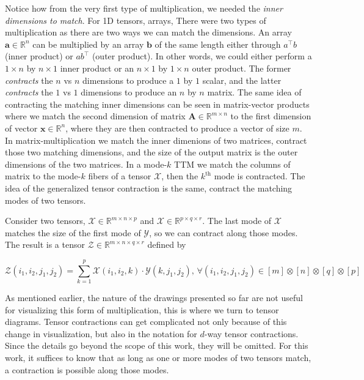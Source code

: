         Notice how from the very first type of multiplication, we needed the
        \textit{inner dimensions to match}. For 1D tensors, arrays, There were
        two types of multiplication as there are two ways we can match the
        dimensions. An array $\mathbf{a} \in \mathbb{R}^{n}$ can be multiplied
        by an array $\mathbf{b}$ of the same length either through $a^\intercal
        b$ (inner product) or $ab^\intercal$ (outer product). In other words, we
        could either perform a $1 \times n$ by $n\times 1$ inner product or an
        $n\times 1$ by $1\times n$ outer product. The former \textit{contracts}
        the $n$ vs $n$ dimensions to produce a $1$ by $1$ scalar, and the latter
        \textit{contracts} the $1$ vs $1$ dimensions to produce an $n$ by $n$
        matrix. The same idea of contracting the matching inner dimensions can
        be seen in matrix-vector products where we match the second dimension of
        matrix $\mathbf{A}\in \mathbb{R}^{m\times n}$ to the first dimension of
        vector $\mathbf{x}\in \mathbb{R}^n$, where they are then contracted to
        produce a vector of size $m$. In matrix-multiplication we match the
        inner dimenions of two matrices, contract those two matching dimensions,
        and the size of the output matrix is the outer dimensions of the two
        matrices. In a mode-$k$ TTM we match the columns of matrix to the
        mode-$k$ fibers of a tensor $\mathcal{X}$, then the $k^\text{th}$ mode
        is contracted. The idea of the generalized tensor contraction is the
        same, contract the matching modes of two tensors. 

        Consider two tensors, $\mathcal{X}\in\mathbb{R}^{m\times n\times p}$ and
        $\mathcal{X}\in\mathbb{R}^{p\times q\times r}$. The last mode of
        $\mathcal{X}$ matches the size of the first mode of $\mathcal{Y}$, so we
        can contract along those modes. The result is a tensor
        $\mathcal{Z}\in\mathbb{R}^{m\times n\times q\times r}$ defined by 

        \begin{equation*}
            \mathcal{Z}(i_1, i_2, j_1, j_2) = \sum_{k=1}^{p} \mathcal{X}(i_1, i_2, k)\cdot \mathcal{Y}(k, j_1, j_2)\text{, }\forall (i_1, i_2, j_1, j_2) \in [m]\otimes[n]\otimes[q]\otimes[p]
        \end{equation*}

        As mentioned earlier, the nature of the drawings presented so far are
        not useful for visualizing this form of multiplication, this is where we
        turn to tensor diagrams. Tensor contractions can get complicated not
        only because of this change in visualization, but also in the notation
        for $d$-way tensor contractions. Since the details go beyond the scope
        of this work, they will be omitted. For this work, it suffices to know
        that as long as one or more modes of two tensors match, a contraction is
        possible along those modes. 